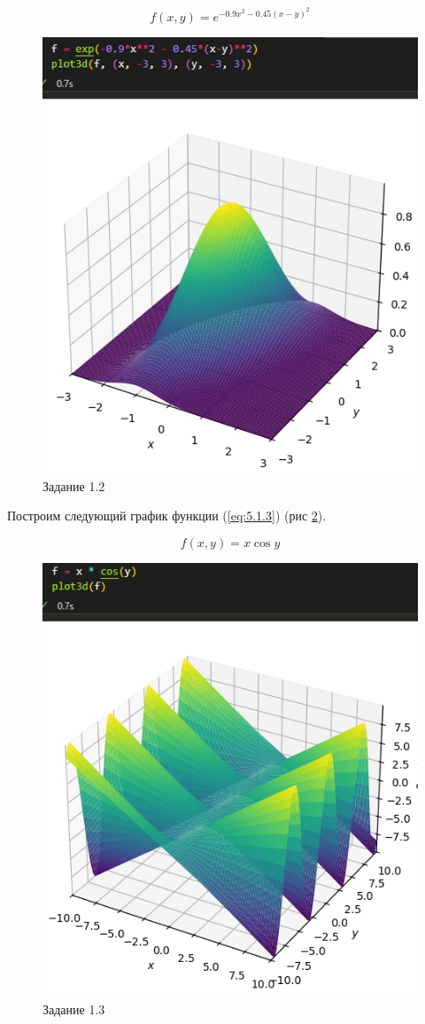 \documentclass[14pt,a4paper]{extarticle}
\begin{document}
\begin{equation}
    \label{eq:5.1.2}
    f(x, y) = e ^ {-0.9x^2-0.45(x-y)^2}
\end{equation}
\begin{figure}
    [ht!]\centering
    \includegraphics[width=0.6\linewidth]{figures/5.1/2.png}
    \caption{Задание 1.2}
    \label{pic:5.1.2}
\end{figure}
\newpage


Построим следующий график функции (\ref{eq:5.1.3}) (рис \ref{pic:5.1.3}).

\begin{equation}
    \label{eq:5.1.3}
    f(x, y) = x \cos{y}
\end{equation}

\begin{figure}
    [ht!]\centering
    \includegraphics[width=0.6\linewidth]{figures/5.1/3.png}
    \caption{Задание 1.3}
    \label{pic:5.1.3}
\end{figure}
\newpage
\end{document}
